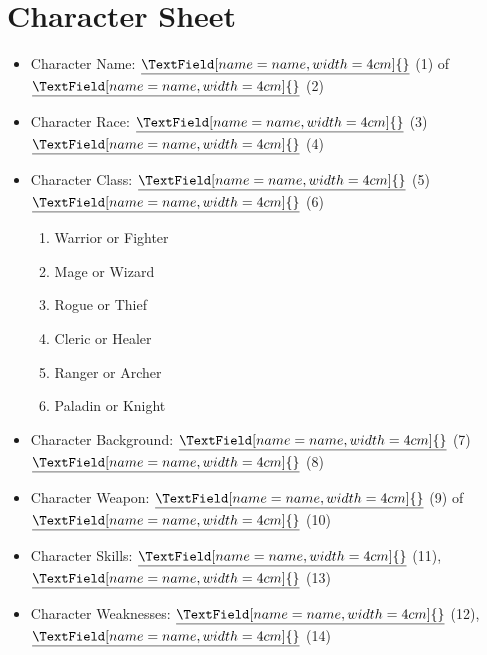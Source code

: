 \documentclass{article}
\begin{document}
\section*{Character Sheet}
\vspace{1cm}
\begin{itemize}
  \item Character Name: $\underline{\TextField[name=name,width=4cm]{}}$ (1) of $\underline{\TextField[name=name,width=4cm]{}}$ (2)
  \item Character Race: $\underline{\TextField[name=name,width=4cm]{}}$ (3) $\underline{\TextField[name=name,width=4cm]{}}$ (4)
  \item Character Class: $\underline{\TextField[name=name,width=4cm]{}}$ (5) $\underline{\TextField[name=name,width=4cm]{}}$ (6)
\begin{multicols}{2}
	\begin{enumerate}
		\item Warrior or Fighter
		\item Mage or Wizard
		\item Rogue or Thief
		\item Cleric or Healer
		\item Ranger or Archer
		\item Paladin or Knight
	\end{enumerate}
\end{multicols}
  \item Character Background: $\underline{\TextField[name=name,width=4cm]{}}$ (7) $\underline{\TextField[name=name,width=4cm]{}}$ (8)
  \item Character Weapon: $\underline{\TextField[name=name,width=4cm]{}}$ (9) of $\underline{\TextField[name=name,width=4cm]{}}$ (10)
  \item Character Skills: $\underline{\TextField[name=name,width=4cm]{}}$ (11), $\underline{\TextField[name=name,width=4cm]{}}$ (13)
  \item Character Weaknesses: $\underline{\TextField[name=name,width=4cm]{}}$ (12), $\underline{\TextField[name=name,width=4cm]{}}$ (14)
\end{itemize}

\vspace{2cm}
\end{document}
